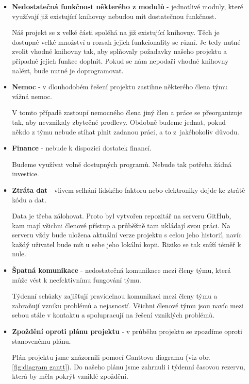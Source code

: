 \documentclass[12pt,a4paper]{article}
\begin{document}
\begin{itemize}
	\item{\textbf{Nedostatečná funkčnost některého z modulů}} - jednotlivé moduly, které využívají již existující knihovny nebudou mít dostatečnou funkčnost.
	
        Náš projekt se z velké části spoléhá na již existující knihovny. Těch je dostupné velké množství a rozsah jejich funkcionality se různí. Je tedy nutné zvolit vhodné knihovny tak, aby splňovaly požadavky našeho projektu a případně jejich funkce doplnit. Pokud se nám nepodaří vhodné knihovny nalézt, bude nutné je doprogramovat.

	\item{\textbf{Nemoc}} - v dlouhodobém řešení projektu zastihne některého člena týmu vážná nemoc. 
	
	V tomto případě zastoupí nemocného člena jiný člen a práce se přeorganizuje tak, aby nevznikaly zbytečné prodlevy. Obdobně budeme jednat, pokud někdo z týmu nebude stíhat plnit zadanou práci, a to z~jakéhokoliv důvodu.
	
	\item{\textbf{Finance}} - nebude k dispozici dostatek financí.
	
	Budeme využívat volně dostupných programů. Nebude tak potřeba žádná investice.
	
	\item{\textbf{Ztráta dat}} - vlivem selhání lidského faktoru nebo elektroniky dojde ke ztrátě kódu a dat.
	
	Data je třeba zálohovat. Proto byl vytvořen repozitář na serveru GitHub, kam mají všichni členové přístup a průběžně tam ukládají svou práci. Na serveru vždy bude uložena aktuální verze projektu s celou jeho historií, navíc každý uživatel bude mít u sebe jeho lokální kopii. Riziko se tak sníží téměř k nule. 
	
	\item{\textbf{Špatná komunikace}} - nedostatečná komunikace mezi členy týmu, která může vést k neefektivnímu fungování týmu. 
	
	Týdenní schůzky zajišťují pravidelnou komunikaci mezi členy týmu a zabraňují vzniku problémů a nejasností. Všichni členové týmu jsou navíc mezi sebou stále v kontaktu a spolupracují na řešení vzniklých problémů.
	
	\item{\textbf{Zpoždění oproti plánu projektu}} - v průběhu projektu se zpozdíme oproti stanovenému plánu.

        Plán projektu jsme znázornili pomocí Ganttova diagramu (viz obr. \ref{fig:diagram gantt}). Do našeho plánu jsme zahrnuli i týdenní časovou rezervu, která by měla pokrýt vzniklé zpoždění.
	

\end{itemize}
\end{document}
